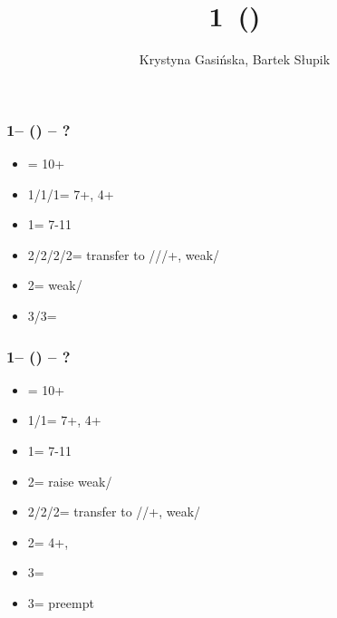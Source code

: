 \documentclass[12pt, a4paper]{article}
\title{1\minor\ (\dbl)}
\author{Krystyna Gasińska, Bartek Słupik}
\begin{document}
\maketitle


\subsubsection*{1\clubs -- (\dbl) -- ?}
\begin{itemize}
    \item \rdbl = 10+
    \item 1\diams/1\hearts/1\spades = 7+\hcp, 4+
    \item 1\nt = 7-11
    \item 2\clubs/2\diams/2\hearts/2\spades = transfer to \diams/\hearts/\spades/+, weak/\gf
    \item 2\nt = \minor weak/\gf
    \item 3\clubs/3\diams = \inv
\end{itemize}

\subsubsection*{1\diams -- (\dbl) -- ?}
\begin{itemize}
    \item \rdbl = 10+
    \item 1\hearts/1\spades = 7+\hcp, 4+
    \item 1\nt = 7-11
    \item 2\clubs = \diams raise weak/\gf
    \item 2\diams/2\hearts/2\spades = transfer to \hearts/\spades/+, weak/\gf
    \item 2\nt = 4+\diams, \invp
    \item 3\clubs = \inv
    \item 3\diams = preempt
\end{itemize}

\end{document}
